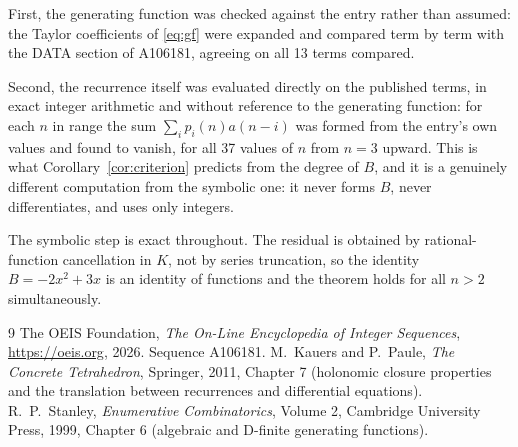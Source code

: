 \documentclass[11pt,a4paper]{article}
\theoremstyle{plain}
\theoremstyle{definition}
\begin{document}
First, the generating function was checked against the entry rather than assumed: the
Taylor coefficients of \eqref{eq:gf} were expanded and compared term by term with the DATA
section of A106181, agreeing on all 13 terms compared.

Second, the recurrence itself was evaluated directly on the published terms, in exact
integer arithmetic and without reference to the generating function: for each $n$ in range
the sum $\sum_{i}p_{i}(n)a(n-i)$ was formed from the entry's own values and found to
vanish, for all 37 values of $n$ from $n=3$ upward. This is what
Corollary~\ref{cor:criterion} predicts from the degree of $B$, and it is a genuinely
different computation from the symbolic one: it never forms $B$, never differentiates, and
uses only integers.

The symbolic step is exact throughout. The residual is obtained by rational-function
cancellation in $K$, not by series truncation, so the identity $B=- 2 x^{2} + 3 x$ is an
identity of functions and the theorem holds for all $n>2$ simultaneously.

\begin{thebibliography}{9}
 The OEIS Foundation, \emph{The On-Line Encyclopedia of Integer Sequences},
\url{https://oeis.org}, 2026. Sequence A106181.
 M.~Kauers and P.~Paule, \emph{The Concrete Tetrahedron}, Springer, 2011,
Chapter 7 (holonomic closure properties and the translation between recurrences and
differential equations).
 R.~P.~Stanley, \emph{Enumerative Combinatorics}, Volume 2, Cambridge
University Press, 1999, Chapter 6 (algebraic and D-finite generating functions).
\end{thebibliography}
\end{document}
